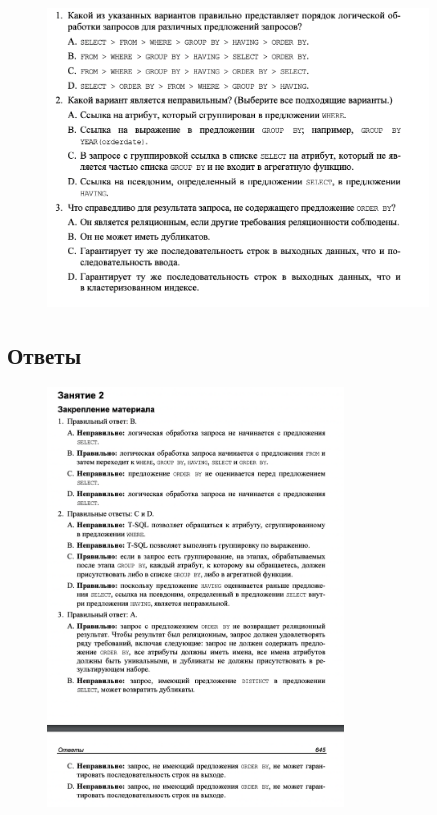 \begin{figure}[h!]
	\begin{center}
		\includegraphics[width=0.9\textwidth]{img/zakrep2.png}
	\end{center}
	\captionsetup{justification=centering}
\end{figure}

\subsection*{Ответы}

\begin{figure}[h!]
	\begin{center}
		\includegraphics[width=0.7\textwidth]{img/ans2.png}
	\end{center}
	\captionsetup{justification=centering}
\end{figure}

